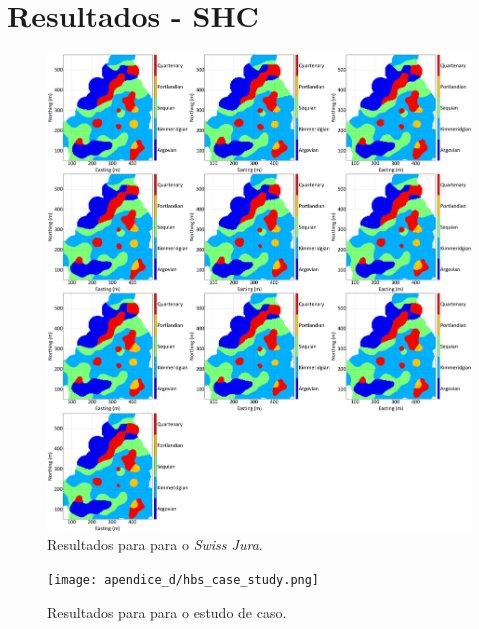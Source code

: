 \chapter{Resultados - SHC}\label{shc_res}

\begin{figure}[H]
	\caption{Resultados para para o \textit{Swiss Jura}.}
	\centering
		\includegraphics[width=1\textwidth]{apendice_d/hbs_jura.png}
\end{figure}

\begin{figure}[H]
	\caption{Resultados para para o estudo de caso.}
	\centering
		\texttt{[image: apendice\_d/hbs\_case\_study.png]}
\end{figure}